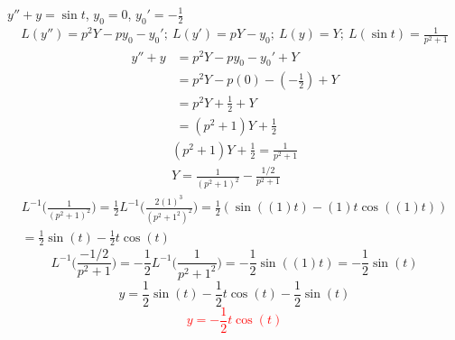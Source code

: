 \item [5.] $y''+y=\sin t$, $y_0=0$, $y_0'=-\frac{1}{2}$
\begin{gather*}
    L(y'')=p^2Y-py_0-y_0';\:
    L(y')=pY-y_0;\:
    L(y)=Y;\:
    L(\sin t)=\frac{1}{p^2+1}
\end{gather*}
\begin{align*}
    y''+y
    &=p^2Y-py_0-y_0'+Y\\
    &=p^2Y-p(0)-(-\frac{1}{2})+Y\\
    &=p^2Y+\frac{1}{2}+Y\\
    &=(p^2+1)Y+\frac{1}{2}
\end{align*}
\begin{gather*}
    (p^2+1)Y+\frac{1}{2}=\frac{1}{p^2+1}\\
    Y=\frac{1}{(p^2+1)^2}-\frac{1/2}{p^2+1}
\end{gather*}
\begin{gather*}
    L^{-1}\Bigg(\frac{1}{(p^2+1)^2}\Bigg) 
    = \frac{1}{2}L^{-1}\Bigg(\frac{2(1)^3}{(p^2+1^2)^2}\Bigg) 
    =\frac{1}{2}(\sin((1)t) - (1)t \cos((1)t))\\
    =\frac{1}{2}\sin(t) - \frac{1}{2}t\cos(t)
    \tag{By \( L17 \)}
\end{gather*}
\begin{equation*}
    L^{-1}\Bigg(\frac{-1/2}{p^2+1}\Bigg) 
    = -\frac{1}{2}L^{-1}\Bigg(\frac{1}{p^2+1^2}\Bigg)
    = -\frac{1}{2}\sin((1)t)
    =-\frac{1}{2}\sin(t)
    \tag{By \( L3 \)}
\end{equation*}
\[
   y= \frac{1}{2}\sin(t) - \frac{1}{2}t\cos(t)-\frac{1}{2}\sin(t)
\]
\textcolor{red}{\[
   y= -\frac{1}{2}t\cos(t)
\]}